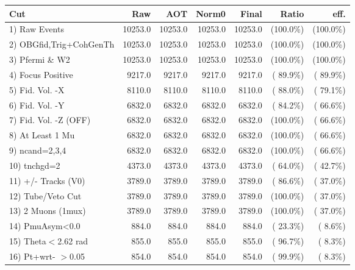  \begin{table}[h!]\centering
 \begin{tabular}{||l||r|r|r|r|r|r||}
 \hline
 \hline
 Cut & Raw & AOT & Norm0 & Final & Ratio & eff.       \\
 \hline
  1) Raw Events           &      10253.0 &      10253.0 &      10253.0 &      10253.0 & (100.0\%) & (100.0\%) \\
  2) OBGfid,Trig+CohGenTh &      10253.0 &      10253.0 &      10253.0 &      10253.0 & (100.0\%) & (100.0\%) \\
  3) Pfermi \& W2         &      10253.0 &      10253.0 &      10253.0 &      10253.0 & (100.0\%) & (100.0\%) \\
  4) Focus Positive       &       9217.0 &       9217.0 &       9217.0 &       9217.0 & ( 89.9\%) & ( 89.9\%) \\
  5) Fid. Vol. -X         &       8110.0 &       8110.0 &       8110.0 &       8110.0 & ( 88.0\%) & ( 79.1\%) \\
  6) Fid. Vol. -Y         &       6832.0 &       6832.0 &       6832.0 &       6832.0 & ( 84.2\%) & ( 66.6\%) \\
  7) Fid. Vol. -Z (OFF)   &       6832.0 &       6832.0 &       6832.0 &       6832.0 & (100.0\%) & ( 66.6\%) \\
  8) At Least 1 Mu        &       6832.0 &       6832.0 &       6832.0 &       6832.0 & (100.0\%) & ( 66.6\%) \\
  9) ncand=2,3,4          &       6832.0 &       6832.0 &       6832.0 &       6832.0 & (100.0\%) & ( 66.6\%) \\
 10) tnchgd=2             &       4373.0 &       4373.0 &       4373.0 &       4373.0 & ( 64.0\%) & ( 42.7\%) \\
 11) +/- Tracks (V0)      &       3789.0 &       3789.0 &       3789.0 &       3789.0 & ( 86.6\%) & ( 37.0\%) \\
 12) Tube/Veto Cut        &       3789.0 &       3789.0 &       3789.0 &       3789.0 & (100.0\%) & ( 37.0\%) \\
 13) 2 Muons (1mux)       &       3789.0 &       3789.0 &       3789.0 &       3789.0 & (100.0\%) & ( 37.0\%) \\
 14) PmuAsym<0.0          &        884.0 &        884.0 &        884.0 &        884.0 & ( 23.3\%) & (  8.6\%) \\
 15) Theta$<$2.62 rad     &        855.0 &        855.0 &        855.0 &        855.0 & ( 96.7\%) & (  8.3\%) \\
 16) Pt+wrt- $>$0.05      &        854.0 &        854.0 &        854.0 &        854.0 & ( 99.9\%) & (  8.3\%) \\

\end{tabular}
\end{table}
